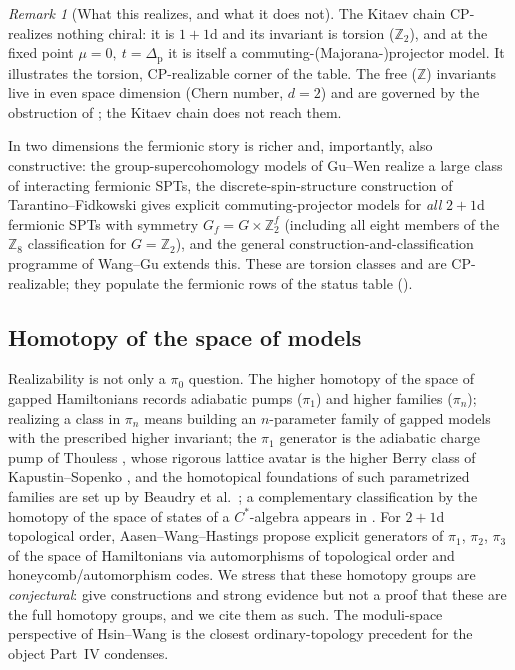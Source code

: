 \documentclass[12pt]{article}
\newcommand{\CP}{\mathrm{CP}}                    %
\newcommand{\Ztwo}{\mathbb{Z}_2}
\newcommand{\Zint}{\mathbb{Z}}
\theoremstyle{definition}
\theoremstyle{remark}
\newtheorem{remark}[theorem]{Remark}
\begin{document}
\begin{remark}[What this realizes, and what it does not]
\label{rem:kitaevfree}
The Kitaev chain $\CP$-realizes nothing chiral: it is $1+1$d and its invariant is
torsion ($\Ztwo$), and at the fixed point $\mu=0,\ t=\Delta_{\mathrm{p}}$ it is itself a
commuting-(Majorana-)projector model. It illustrates the torsion, $\CP$-realizable corner of
the table. The free ($\Zint$) invariants live in even space dimension (Chern number,
$d=2$) and are governed by the obstruction of ; the Kitaev chain does not
reach them.
\end{remark}

In two dimensions the fermionic story is richer and, importantly, also constructive: the
group-supercohomology models of Gu--Wen \cite{gu-wen-supercohomology} realize a large class of
interacting fermionic SPTs, the discrete-spin-structure construction of Tarantino--Fidkowski
\cite{tarantino-fidkowski} gives explicit commuting-projector models for \emph{all} $2+1$d
fermionic SPTs with symmetry $G_f=G\times\Ztwo^f$ (including all eight members of the
$\Zint_8$ classification for $G=\Ztwo$), and the general construction-and-classification
programme of Wang--Gu \cite{wang-gu-fermionic} extends this. These are torsion classes and are
$\CP$-realizable; they populate the fermionic rows of the status table ().

\subsection{Homotopy of the space of models}

Realizability is not only a $\pi_0$ question. The higher homotopy of the space of gapped
Hamiltonians records adiabatic pumps ($\pi_1$) and higher families ($\pi_n$); realizing a
class in $\pi_n$ means building an $n$-parameter family of gapped models with the prescribed
higher invariant; the $\pi_1$ generator is the adiabatic charge pump of Thouless
\cite{thouless-pump}, whose rigorous lattice avatar is the higher Berry class of
Kapustin--Sopenko \cite{kapustin-sopenko-noether}, and the homotopical foundations of such
parametrized families are set up by Beaudry et al.\ \cite{beaudry-etal}; a complementary
classification by the homotopy of the space of states of a $C^*$-algebra appears in
\cite{denittis-states,denittis-rendel-weyl}. For $2+1$d topological order,
Aasen--Wang--Hastings
\cite{aasen-wang-hastings} propose explicit generators of $\pi_1$, $\pi_2$, $\pi_3$ of the
space of Hamiltonians via automorphisms of topological order and honeycomb/automorphism
codes. We stress that these homotopy groups are \emph{conjectural}: \cite{aasen-wang-hastings}
give constructions and strong evidence but not a proof that these are the full homotopy
groups, and we cite them as such. The moduli-space perspective of Hsin--Wang
\cite{hsin-wang-moduli} is the closest ordinary-topology precedent for the object Part~IV
condenses.
\end{document}
